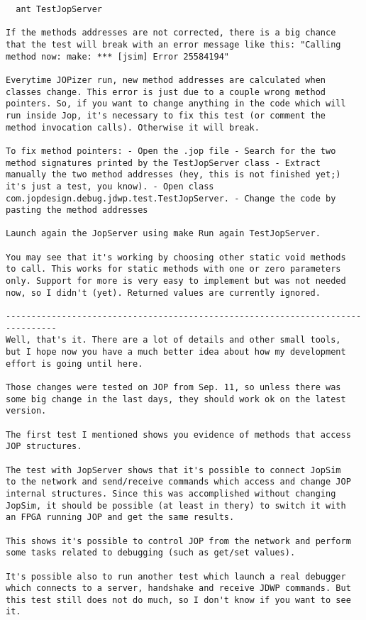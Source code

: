 \begin{verbatim}
  ant TestJopServer

If the methods addresses are not corrected, there is a big chance
that the test will break with an error message like this: "Calling
method now: make: *** [jsim] Error 25584194"

Everytime JOPizer run, new method addresses are calculated when
classes change. This error is just due to a couple wrong method
pointers. So, if you want to change anything in the code which will
run inside Jop, it's necessary to fix this test (or comment the
method invocation calls). Otherwise it will break.

To fix method pointers: - Open the .jop file - Search for the two
method signatures printed by the TestJopServer class - Extract
manually the two method addresses (hey, this is not finished yet;)
it's just a test, you know). - Open class
com.jopdesign.debug.jdwp.test.TestJopServer. - Change the code by
pasting the method addresses

Launch again the JopServer using make Run again TestJopServer.

You may see that it's working by choosing other static void methods
to call. This works for static methods with one or zero parameters
only. Support for more is very easy to implement but was not needed
now, so I didn't (yet). Returned values are currently ignored.

--------------------------------------------------------------------------------
Well, that's it. There are a lot of details and other small tools,
but I hope now you have a much better idea about how my development
effort is going until here.

Those changes were tested on JOP from Sep. 11, so unless there was
some big change in the last days, they should work ok on the latest
version.

The first test I mentioned shows you evidence of methods that access
JOP structures.

The test with JopServer shows that it's possible to connect JopSim
to the network and send/receive commands which access and change JOP
internal structures. Since this was accomplished without changing
JopSim, it should be possible (at least in thery) to switch it with
an FPGA running JOP and get the same results.

This shows it's possible to control JOP from the network and perform
some tasks related to debugging (such as get/set values).

It's possible also to run another test which launch a real debugger
which connects to a server, handshake and receive JDWP commands. But
this test still does not do much, so I don't know if you want to see
it.


\end{verbatim}
